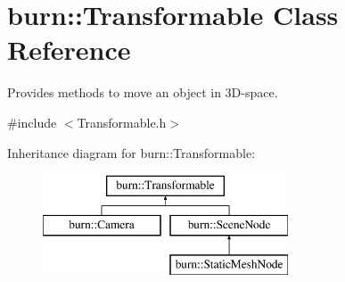 \hypertarget{classburn_1_1_transformable}{\section{burn\-:\-:Transformable Class Reference}
\label{classburn_1_1_transformable}
}


Provides methods to move an object in 3\-D-\/space.  




{\ttfamily \#include $<$Transformable.\-h$>$}

Inheritance diagram for burn\-:\-:Transformable\-:\begin{figure}[H]
\begin{center}
\leavevmode
\includegraphics[height=3.000000cm]{classburn_1_1_transformable}
\end{center}
\end{figure}
